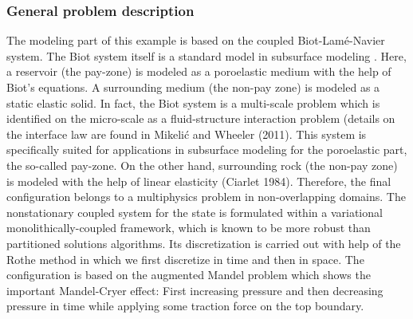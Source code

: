 \subsubsection{General problem description}
The modeling part of this example is based on the coupled
Biot-Lam\'e-Navier system. The Biot system itself   
is a standard model in subsurface modeling \cite{Biot41a, Biot41b, Biot55}. 
Here, a reservoir (the
pay-zone) is modeled as a poroelastic medium with the help of Biot's
equations. A surrounding medium (the non-pay zone) is modeled as a static
elastic solid. 
In fact, the
Biot system is a multi-scale problem which 
is identified on the micro-scale as 
a fluid-structure interaction problem (details on the 
interface law are found in Mikeli\'c and Wheeler (2011). 
This system 
is specifically suited for applications 
in subsurface modeling for the poroelastic part, the 
so-called pay-zone.  
On the other hand, surrounding rock 
(the non-pay zone) 
is modeled with the help of linear elasticity (Ciarlet 1984). 
Therefore, the final configuration 
belongs to a multiphysics problem in non-overlapping domains.
The nonstationary coupled system for the state is formulated 
within a variational monolithically-coupled framework, 
which is known 
to be more robust than partitioned solutions algorithms.
Its discretization 
is carried out with help of the Rothe method in which we first 
discretize in time and then in space. 
The configuration 
is based on the augmented Mandel problem which 
shows the important Mandel-Cryer effect: First increasing pressure
and then decreasing pressure in time while applying some 
traction force on the top boundary. 

